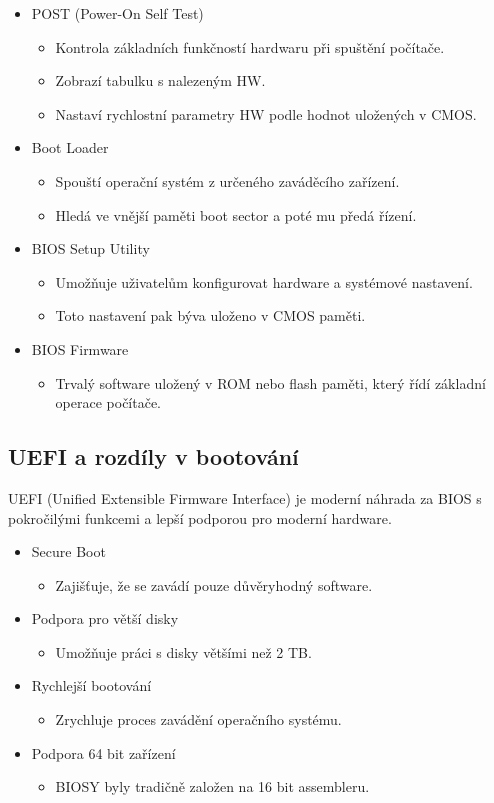 \begin{itemize}
\item POST (Power-On Self Test)
\begin{itemize}
\item Kontrola základních funkčností hardwaru při spuštění počítače.
\item Zobrazí tabulku s nalezeným HW.
\item Nastaví rychlostní parametry HW podle hodnot uložených v CMOS.
\end{itemize}
\item Boot Loader
\begin{itemize}
\item Spouští operační systém z určeného zaváděcího zařízení.
\item Hledá ve vnější paměti boot sector a poté mu předá řízení. 
\end{itemize}
\item BIOS Setup Utility
\begin{itemize}
\item Umožňuje uživatelům konfigurovat hardware a systémové nastavení.
\item Toto nastavení pak býva uloženo v CMOS paměti.
\end{itemize}
\item BIOS Firmware
\begin{itemize}
\item Trvalý software uložený v ROM nebo flash paměti, který řídí základní operace počítače.
\end{itemize}
\end{itemize}

\subsection{UEFI a rozdíly v bootování}
UEFI (Unified Extensible Firmware Interface) je moderní náhrada za BIOS s pokročilými funkcemi a lepší podporou pro moderní hardware.

\begin{itemize}
\item Secure Boot
\begin{itemize}
\item Zajišťuje, že se zavádí pouze důvěryhodný software.
\end{itemize}
\item Podpora pro větší disky
\begin{itemize}
\item Umožňuje práci s disky většími než 2 TB.
\end{itemize}
\item Rychlejší bootování
\begin{itemize}
\item Zrychluje proces zavádění operačního systému.
\end{itemize}
\item Podpora 64 bit zařízení
\begin{itemize}
    \item BIOSY byly tradičně založen na 16 bit assembleru.
\end{itemize}
\end{itemize}

